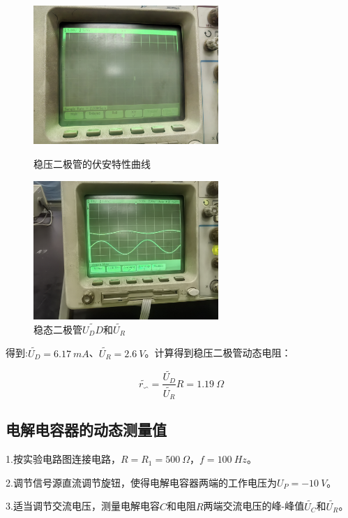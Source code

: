 \documentclass{article}
\begin{document}
\begin{figure}[!ht]
    \centering
    \begin{minipage}{0.45\textwidth} %
        \centering
        \includegraphics[width=7cm]{2.jpg} %
        \caption{稳压二极管的伏安特性曲线}
    \end{minipage}\hfill
    \begin{minipage}{0.45\textwidth}
        \centering
        \includegraphics[width=7cm]{1.jpg} %
        \caption{稳态二极管$\widetilde{U_DD}$和$\widetilde{U_R}$}
    \end{minipage}
\end{figure}

得到:$\widetilde{U_D}=6.17\ mA$、$\widetilde{U_R}=2.6\ V$。计算得到稳压二极管动态电阻：

$$
\widetilde{r_{\backsim}}=\frac{\widetilde{U_D}}{\widetilde{U_R}}R=1.19\ \Omega
$$

\subsection{电解电容器的动态测量值}
1.按实验电路图连接电路，$R=R_1=500\ \Omega$，$f=100\ Hz$。

2.调节信号源直流调节旋钮，使得电解电容器两端的工作电压为$U_P=-10\ V$。

3.适当调节交流电压，测量电解电容$C$和电阻$R$两端交流电压的峰-峰值$\widetilde{U_C}$和$\widetilde{U_R}$。
\end{document}

